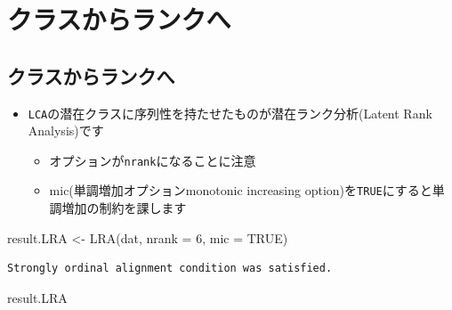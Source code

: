 \documentclass[
  a4paper,
]{ltjsbook}
\newenvironment{Shaded}{\begin{snugshade}}{\end{snugshade}}
\newcommand{\AttributeTok}[1]{\textcolor[rgb]{0.40,0.45,0.13}{#1}}
\newcommand{\ConstantTok}[1]{\textcolor[rgb]{0.56,0.35,0.01}{#1}}
\newcommand{\DecValTok}[1]{\textcolor[rgb]{0.68,0.00,0.00}{#1}}
\newcommand{\FunctionTok}[1]{\textcolor[rgb]{0.28,0.35,0.67}{#1}}
\newcommand{\NormalTok}[1]{\textcolor[rgb]{0.00,0.23,0.31}{#1}}
\newcommand{\OtherTok}[1]{\textcolor[rgb]{0.00,0.23,0.31}{#1}}
\providecommand{\tightlist}{%
  \setlength{\itemsep}{0pt}\setlength{\parskip}{0pt}}\usepackage{longtable,booktabs,array}
\begin{document}
\section{クラスからランクへ}\label{ux30afux30e9ux30b9ux304bux3089ux30e9ux30f3ux30afux3078}

\subsection{クラスからランクへ}\label{ux30afux30e9ux30b9ux304bux3089ux30e9ux30f3ux30afux3078-1}

\begin{itemize}
\tightlist
\item
  \texttt{LCA}の潜在クラスに序列性を持たせたものが潜在ランク分析(Latent
  Rank Analysis)です

  \begin{itemize}
  \tightlist
  \item
    オプションが\texttt{nrank}になることに注意
  \item
    mic(単調増加オプションmonotonic increasing
    option)を\texttt{TRUE}にすると単調増加の制約を課します
  \end{itemize}
\end{itemize}

\begin{Shaded}
\begin{Highlighting}[]
\NormalTok{result.LRA }\OtherTok{\textless{}{-}} \FunctionTok{LRA}\NormalTok{(dat, }\AttributeTok{nrank =} \DecValTok{6}\NormalTok{, }\AttributeTok{mic =} \ConstantTok{TRUE}\NormalTok{)}
\end{Highlighting}
\end{Shaded}

\begin{verbatim}
Strongly ordinal alignment condition was satisfied.
\end{verbatim}

\begin{Shaded}
\begin{Highlighting}[]
\NormalTok{result.LRA}
\end{Highlighting}
\end{Shaded}
\end{document}
